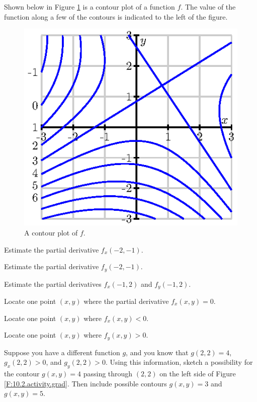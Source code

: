 \begin{activity} \label{A:10.2.13} 
  Shown below in Figure \ref{F:10.2.activity.contour} is a contour
  plot of a function $f$.  The value of the function along a few
  of the contours is indicated to the left of the figure.

\begin{figure}[ht]
  \begin{center}
    \includegraphics{figures/fig_10_2_activity_contours.eps}
    \caption{A contour plot of $f$.}
    \label{F:10.2.activity.contour}
  \end{center}
\end{figure}

\ba
\item Estimate the partial derivative $f_x(-2,-1)$.  
\item Estimate the partial derivative $f_y(-2,-1)$.
\item Estimate the partial derivatives $f_x(-1,2)$ and $f_y(-1,2)$.  
\item Locate one point $(x,y)$ where the partial derivative $f_x(x,y)=
  0$. 
\item Locate one point $(x,y)$ where $f_x(x,y)<0$.
\item Locate one point $(x,y)$ where $f_y(x,y)>0$.
\item Suppose you have a different function $g$, and you know that $g(2,2) =
  4$, $g_x(2,2) > 0$, and $g_y(2,2) > 0$.  Using this information,
  sketch a possibility for the contour $g(x,y)=4$ passing through
  $(2,2)$ on the left side of Figure \ref{F:10.2.activity.grad}.  Then
  include possible contours $g(x,y) = 3$ and $g(x,y) = 5$.


\end{activity}
